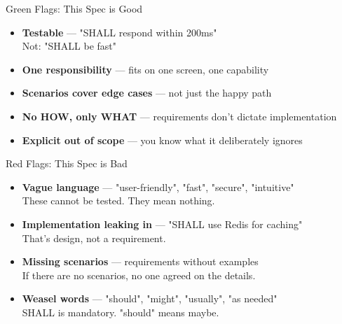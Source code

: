 \documentclass[aspectratio=169,18pt]{beamer}
\begin{document}
\begin{frame}{Green Flags: This Spec is Good}
  \vspace{0.3em}
  \begin{itemize}\setlength\itemsep{0.6em}
    \item \textbf{\color{opengreen}Testable} — "SHALL respond within 200ms"\\
      \small\color{opengray}Not: "SHALL be fast"\normalsize
    \item \textbf{\color{opengreen}One responsibility} — fits on one screen, one capability
    \item \textbf{\color{opengreen}Scenarios cover edge cases} — not just the happy path
    \item \textbf{\color{opengreen}No HOW, only WHAT} — requirements don't dictate implementation
    \item \textbf{\color{opengreen}Explicit out of scope} — you know what it deliberately ignores
  \end{itemize}
\end{frame}

\begin{frame}[fragile]{Red Flags: This Spec is Bad}
  \vspace{0.3em}
  \begin{itemize}\setlength\itemsep{0.6em}
    \item \textbf{\color{openred}Vague language} — "user-friendly", "fast", "secure", "intuitive"\\
      \small\color{opengray}These cannot be tested. They mean nothing.\normalsize
    \item \textbf{\color{openred}Implementation leaking in} — "SHALL use Redis for caching"\\
      \small\color{opengray}That's design, not a requirement.\normalsize
    \item \textbf{\color{openred}Missing scenarios} — requirements without examples\\
      \small\color{opengray}If there are no scenarios, no one agreed on the details.\normalsize
    \item \textbf{\color{openred}Weasel words} — "should", "might", "usually", "as needed"\\
      \small\color{opengray}SHALL is mandatory. "should" means maybe.\normalsize
  \end{itemize}
\end{frame}
\end{document}

